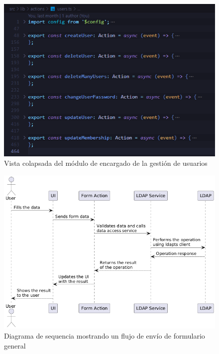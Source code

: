 \begin{figure}[h]
    \centering
    \includegraphics{images/code/collapsed-view-of-user-module.png}
    \caption{Vista colapsada del módulo de encargado de la gestión de usuarios}
    \label{fig:collapsed-view-of-user-module}
\end{figure}

\begin{figure}[h]
    \centering
    \includegraphics[width=\linewidth]{images/puml/sequence diagram form submission/sequence diagram form submission.png}
    \caption{Diagrama de sequencia mostrando un flujo de envío de formulario general}
    \label{fig:general-form-submission-diagram}
\end{figure}

